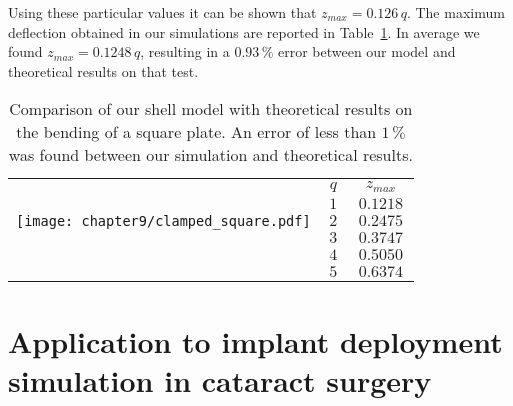 Using these particular values it can be shown that $z_{max} = 0.126\,q$. The maximum deflection obtained in our simulations are reported in Table~\ref{chap9:tab-results}. In average we found $z_{max} = 0.1248\,q $, resulting in a $0.93\,\%$ error between our model and theoretical results on that test. 
%
\begin{table}[ht]
	\centering
	\begin{tabular}{p{9cm}|c|c|}
	\cline{2-3}
	\multirow{5}{*}{\texttt{[image: chapter9/clamped\_square.pdf]}} & $q$ & $z_{max}$ \tabularnewline
	\cline{2-3}
	& $\,1\,$ & $\, 0.1218 \,$ \tabularnewline
	& $\,2\,$ & $\, 0.2475 \,$ \tabularnewline		
	& $\,3\,$ & $\, 0.3747 \,$ \tabularnewline	
	& $\,4\,$ & $\, 0.5050 \,$ \tabularnewline		
	& $\,5\,$ & $\, 0.6374 \,$ \tabularnewline
	\cline{2-3}
	\end{tabular}
	\vspace{1cm}
	\caption{Comparison of our shell model with theoretical results on the bending of a square plate. An error of less than $1\,\%$ was found between our simulation and theoretical results.}
	\label{chap9:tab-results}
\end{table}


\section{Application to implant deployment simulation in cataract surgery}

